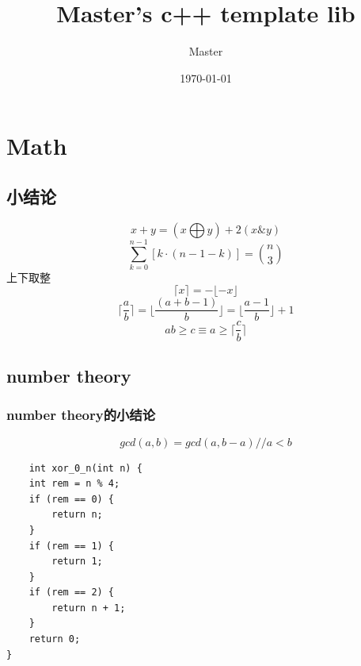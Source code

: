 \documentclass[UTF8]{ctexart}
\title{Master's c++ template lib}
\author{Master}
\date{\today}
\begin{document}
\begin{titlepage}
    \maketitle
\end{titlepage}
\tableofcontents
\section{Math}
\subsection{小结论}
\[
x+y= ( x\bigoplus y ) + 2 ( x \& y )
\]
\[
\sum_{k=0}^{n-1} \left[ k \cdot (n-1-k) \right] = \binom{n}{3}
\]
上下取整
\[
\lceil x \rceil = - \lfloor - x \rfloor
\]
\[
\lceil \frac{a}{b} \rceil =\lfloor \frac{(a+b-1)}{b} \rfloor = \lfloor \frac{a-1}{b} \rfloor +1
\]
\[
ab\ge c \equiv a\ge \lceil \frac{c}{b} \rceil
\]
\subsection{number theory}
\subsubsection{number theory的小结论}
\[
gcd(a,b)=gcd(a,b-a)//a<b
\]
\begin{lstlisting}
    int xor_0_n(int n) {
    int rem = n % 4;
    if (rem == 0) {
        return n;
    }
    if (rem == 1) {
        return 1;
    }
    if (rem == 2) {
        return n + 1;
    }
    return 0;
}
\end{lstlisting}
\end{document}
